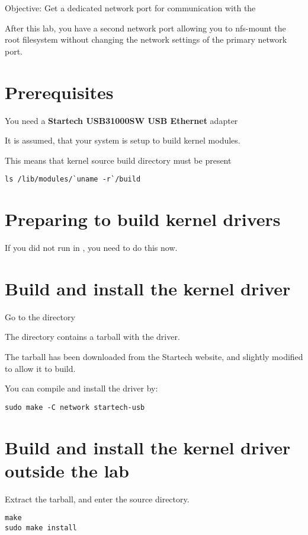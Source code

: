 {Objective: Get a dedicated network port for communication with the \devboard}

After this lab, you have a second network port allowing you to nfs-mount the \devboard
root filesystem without changing the network settings of the primary network port.

\section{Prerequisites}

You need a {\bf Startech USB31000SW USB Ethernet}  adapter

It is assumed, that your system is setup to build kernel modules.

This means that kernel source build directory must be present

\begin{verbatim}
ls /lib/modules/`uname -r`/build
\end{verbatim}

\section{Preparing to build kernel drivers}

If you did not run  in \labdir, you need to do this now.

\section{Build and install the kernel driver}

Go to the \labdir directory 

The  directory contains a tarball with the driver.

The tarball has been downloaded from the Startech website, and slightly
modified to allow it to build.

You can compile and install the driver by:

\begin{verbatim}
sudo make -C network startech-usb
\end{verbatim}

\section{Build and install the kernel driver outside the lab}

Extract the tarball, and enter the source directory.

\begin{verbatim}
make
sudo make install
\end{verbatim}




